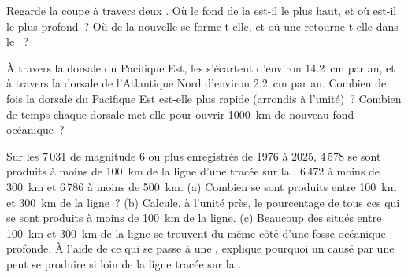 \begin{exercise}[$\star\star$]\label{exo:g7:plate-tectonics:10}
Regarde la coupe à travers deux . Où le fond de la 
est-il le plus haut, et où est-il le plus profond~? Où de la 
nouvelle se forme-t-elle, et où une  retourne-t-elle dans le
~?
\end{exercise}

\begin{exercise}[$\star\star\star$]\label{exo:g7:plate-tectonics:11}
À travers la dorsale du Pacifique Est, les  s'écartent d'environ
\qty{14.2}{cm} par an, et à travers la dorsale de l'Atlantique Nord
d'environ \qty{2.2}{cm} par an. Combien de fois la dorsale du Pacifique Est
est-elle plus rapide (arrondis à l'unité)~? Combien de temps chaque
dorsale met-elle pour ouvrir \qty{1000}{km} de nouveau fond océanique~?
\end{exercise}

\begin{exercise}[$\star\star\star$]\label{exo:g7:plate-tectonics:12}
Sur les 7\,031  de magnitude 6 ou plus enregistrés de 1976 à 2025,
4\,578 se sont produits à moins de \qty{100}{km} de la ligne d'une  tracée sur la , 6\,472 à moins de \qty{300}{km} et 6\,786
à moins de \qty{500}{km}.
(a) Combien se sont produits entre \qty{100}{km} et \qty{300}{km} de la
ligne~? (b) Calcule, à l'unité près, le pourcentage de tous ces  qui
se sont produits à moins de \qty{100}{km} de la ligne. (c) Beaucoup des
 situés entre \qty{100}{km} et \qty{300}{km} de la ligne se
trouvent du même côté d'une fosse océanique profonde. À l'aide de ce qui
se passe à une , explique pourquoi un  causé par
une  peut se produire si loin de la ligne tracée sur la
.
\end{exercise}

